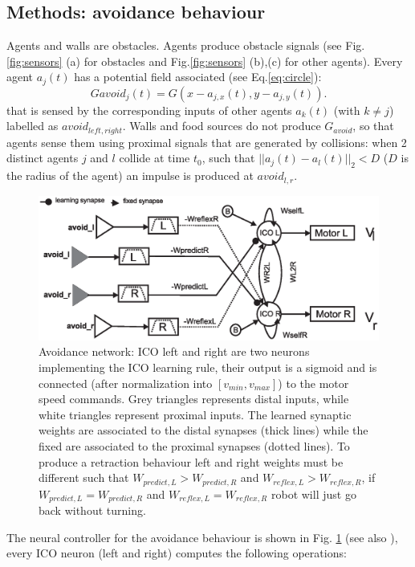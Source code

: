 \subsection{Methods: avoidance behaviour}
Agents and walls are obstacles. Agents produce obstacle
signals (see Fig.\ref{fig:sensors} (a) for obstacles and
Fig.\ref{fig:sensors} (b),(c) for other agents). Every agent $a_{j}(t)$ has a
potential field associated (see Eq.\ref{eq:circle}):
\begin{equation}
Gavoid_{j}(t)=G(x-a_{j,x}(t),y-a_{j,y}(t)).
\end{equation}
that is sensed by the corresponding inputs of other agents $a_{k}(t)$ (with $k\neq j$)
labelled as $avoid_{left,right}$. Walls and food sources
do not produce $G_{avoid}$, so that agents sense them using proximal signals that are
generated by collisions: when 2 distinct agents $j$ and $l$ collide at time $t_{0}$, such
that $||a_{j}(t)-a_{l}(t)||_{2}<D$ ($D$ is the radius of the
agent) an impulse is produced at $avoid_{l,r}$.
\begin{figure}[htb]
\begin{center}
\includegraphics[scale=0.45]{figures/socialadapt/avoidance.eps}
\end{center}
\vspace*{4pt}
\small{
\caption[Avoidance learning behaviour]{Avoidance network: ICO left and right are
two neurons implementing the ICO learning rule, their output is a sigmoid and
is connected (after normalization into $[v_{min},v_{max}]$) to the motor speed commands.
Grey triangles represents distal inputs, while white triangles represent proximal inputs.
The learned synaptic weights are associated to the distal synapses (thick lines) while
the fixed are associated to the proximal synapses (dotted lines).
To produce a retraction behaviour left and right weights must be different
such that
$W_{predict,L}>W_{predict,R}$ and $W_{reflex,L}>W_{reflex,R}$, if
$W_{predict,L}=W_{predict,R}$ and $W_{reflex,L}=W_{reflex,R}$ robot
will just go back without turning.\label{fig:avoidance}}}
\end{figure}
The neural controller for the avoidance behaviour is shown in
Fig. \ref{fig:avoidance} (see also \citealt{Stamm2006}), every ICO neuron (left and right)
computes the following operations:

